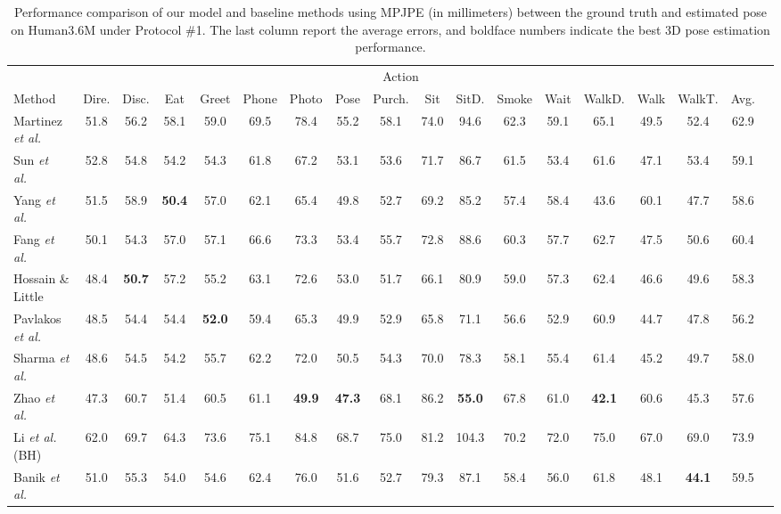 \documentclass{bmvc2k}
\begin{document}
\begin{table*}[!htb]
\caption{Performance comparison of our model and baseline methods using MPJPE (in millimeters) between the ground truth and estimated pose on Human3.6M under Protocol \#1. The last column report the average errors, and boldface numbers indicate the best 3D pose estimation performance.}
\footnotesize
\setlength{\tabcolsep}{.4pt}
\medskip
\centering
\begin{tabular}{l*{17}{c}}
\toprule
& \multicolumn{15}{c}{Action}\\
\cmidrule(lr){2-16}
Method & Dire. & Disc. &  Eat & Greet & Phone & Photo &  Pose & Purch. & Sit & SitD. & Smoke & Wait & WalkD. & Walk & WalkT. & Avg.\\
\midrule
Martinez \textit{et al.}~\cite{martinez2017simple} &  51.8 &56.2 &58.1 &59.0 &69.5& 78.4 &55.2 &58.1 &74.0 &94.6 &62.3 &59.1& 65.1& 49.5& 52.4 &62.9\\
Sun \textit{et al.}~\cite{sun2017compositional} &52.8& 54.8& 54.2& 54.3 &61.8 &67.2& 53.1& 53.6 &71.7 &86.7 &61.5 &53.4& 61.6 &47.1& 53.4 &59.1\\
Yang \textit{et al.}~\cite{yang20183d} & 51.5& 58.9& \textbf{50.4} &57.0& 62.1& 65.4 &49.8& 52.7& 69.2& 85.2& 57.4& 58.4& 43.6& 60.1& 47.7& 58.6\\
Fang \textit{et al.}~\cite{fang2018learning}& 50.1 &54.3& 57.0& 57.1& 66.6& 73.3& 53.4& 55.7& 72.8& 88.6& 60.3 &57.7& 62.7& 47.5 &50.6& 60.4\\
Hossain \& Little~\cite{rayat2018exploiting}  & 48.4 & \textbf{50.7} & 57.2 & 55.2 & 63.1 & 72.6 & 53.0 & 51.7 & 66.1 & 80.9 & 59.0 & 57.3 & 62.4 & 46.6 & 49.6 & 58.3\\
Pavlakos \textit{et al.}~\cite{pavlakos2018ordinal} & 48.5& 54.4& 54.4& \textbf{52.0} &59.4 &65.3 &49.9& 52.9& 65.8 &71.1& 56.6& 52.9& 60.9& 44.7& 47.8& 56.2\\
Sharma \textit{et al.}~\cite{sharma2019monocular} & 48.6 &54.5& 54.2& 55.7& 62.2& 72.0& 50.5& 54.3& 70.0& 78.3 &58.1& 55.4& 61.4& 45.2& 49.7& 58.0\\
Zhao \textit{et al.}~\cite{zhao2019semantic} & 47.3& 60.7& 51.4 &60.5& 61.1& \textbf{49.9}& \textbf{47.3}& 68.1 &86.2& \textbf{55.0}& 67.8& 61.0& \textbf{42.1}& 60.6& 45.3& 57.6\\
Li \textit{et al.}~\cite{ChenLiLee:2020} (BH) & 62.0 & 69.7 & 64.3 & 73.6 & 75.1 & 84.8 & 68.7 & 75.0 & 81.2 & 104.3 & 70.2 & 72.0 & 75.0 & 67.0 & 69.0 & 73.9\\
Banik \textit{et al.}~\cite{Banik:2021} & 51.0 & 55.3 & 54.0 & 54.6 & 62.4 & 76.0 & 51.6 & 52.7 & 79.3 & 87.1 & 58.4 & 56.0 & 61.8 & 48.1 & \textbf{44.1} & 59.5\\

\end{tabular}
\end{table*}
\end{document}
